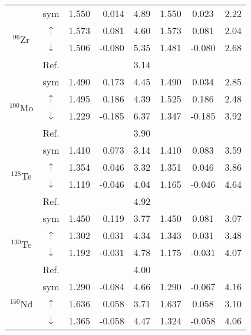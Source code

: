 \documentclass[nofootinbib,twocolumn,eqsecnum,floats,aps]{revtex4}
\begin{document}
{\begin{table}[t]
\begin{center}
\begin{tabular}{|c|c|crc|ccc|}
%
\multirow{4}{*}{$^{96}$Zr}& sym   & 1.550 &   0.014   &    4.89    & 1.550  &   0.023    & 2.22 \\
                &   $\uparrow$    & 1.573 &   0.081   &    4.60    & 1.573  &   0.081    & 2.04 \\
                &   $\downarrow$  & 1.506 &  -0.080   &    5.35    & 1.481  &  -0.080    & 2.68\\
                &Ref. \cite{Hyv15}&       &           &    3.14    &        &            &  \\\hline
%
\multirow{4}{*}{$^{100}$Mo} & sym & 1.490 &   0.173   &    4.45    & 1.490  &   0.034    & 2.85 \\
                &   $\uparrow$    & 1.495 &   0.186   &    4.39    & 1.525  &   0.186    & 2.48\\
                & $\downarrow$    & 1.229 &  -0.185   &    6.37    & 1.347  &  -0.185    & 3.92\\
              &Ref. \cite{Hyv15}  &       &           &    3.90    &        &            & \\\hline
%
\multirow{4}{*}{$^{128}$Te} & sym & 1.410 &  0.073    &    3.14    & 1.410  &   0.083    & 3.59\\
                &   $\uparrow$    & 1.354 &  0.046    &    3.32    & 1.351  &   0.046    & 3.86\\
                &   $\downarrow$  & 1.119 & -0.046    &    4.04    & 1.165  &  -0.046    & 4.64\\
              &Ref. \cite{Hyv15}  &       &           &    4.92    &        &            &  \\\hline
%
\multirow{4}{*}{$^{130}$Te} & sym & 1.450 &  0.119    &    3.77    & 1.450  &   0.081    & 3.07\\
                &   $\uparrow$    & 1.302  & 0.031    &    4.34    & 1.343  &   0.031    & 3.48\\
                &   $\downarrow$  & 1.192  &-0.031    &    4.78    & 1.175  &  -0.031    & 4.07\\
              &Ref. \cite{Hyv15}  &        &          &    4.00    &        &            & \\\hline
%
\multirow{3}{*}{$^{150}$Nd} & sym & 1.290  & -0.084   &    4.66    & 1.290  &  -0.067    & 4.16\\
                &   $\uparrow$    & 1.636  &  0.058   &    3.71    & 1.637  &   0.058    & 3.10\\
                &   $\downarrow$  & 1.365  & -0.058   &    4.47    & 1.324  &  -0.058    & 4.06\\\hline

\end{tabular}
\end{center}
\end{table}}
\end{document}
